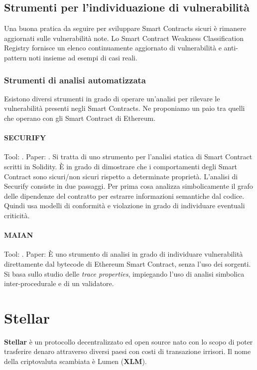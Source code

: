 \subsection{Strumenti per l'individuazione di vulnerabilità}
Una buona pratica da seguire per sviluppare Smart Contracts sicuri è
rimanere aggiornati sulle vulnerabilità note.
Lo Smart Contract Weakness Classification Registry \cite{swc-registry} fornisce un elenco
continuamente aggiornato di vulnerabilità e anti-pattern noti insieme ad esempi
di casi reali.

\subsubsection{Strumenti di analisi automatizzata}
Esistono diversi strumenti in grado di operare un'analisi per
rilevare le vulnerabilità presenti
negli Smart Contracts. Ne proponiamo un paio tra quelli che operano con
gli Smart Contract di Ethereum.

\paragraph{SECURIFY} Tool: \cite{secufiry-url}. Paper: \cite{secufiry-paper}.
Si tratta di uno strumento per l'analisi statica di Smart Contract scritti in Solidity. È in grado
di dimostrare che i comportamenti degli Smart Contract sono sicuri/non sicuri
rispetto a determinate proprietà.
L'analisi di Securify consiste in due passaggi.
Per prima cosa analizza simbolicamente il grafo delle dipendenze
del contratto per estrarre informazioni semantiche dal codice.
Quindi usa modelli di conformità e violazione
in grado di individuare eventuali criticità.

\paragraph{MAIAN} Tool: \cite{maian-url}. Paper: \cite{Nikolic2018FindingTG}
È uno strumento di analisi in grado di individuare vulnerabilità direttamente
dal bytecode di Ethereum Smart Contract, senza l'uso dei sorgenti.
Si basa sullo studio delle \textit{trace properties}, impiegando l'uso di
analisi simbolica inter-procedurale e di un validatore.


\section{Stellar}

\textbf{Stellar} è un protocollo decentralizzato ed
open source nato con lo scopo di poter
trasferire denaro attraverso diversi
paesi con costi di transazione irrisori. Il nome della criptovaluta scambiata
è Lumen (\textbf{XLM}).

